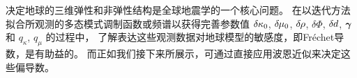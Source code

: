 {{{{%

决定地球的三维弹性和非弹性结构是全球地震学的一个核心问题。
在以迭代方法拟合所观测的多态模式调制函数或频谱以获得完善参数值
$\delta\hspace{-0.1 mm}\kappa_0$, $\delta\hspace{-0.2 mm}\mu_0$,
$\delta\hspace{-0.2 mm}\rho$, $\delta\Phi$,
$\delta\hspace{-0.1 mm}d$, $\mbox{\boldmath $\bf \gamma$}$ 和 $q_{\kappa}$, $q_{\mu}$
的过程中，
了解表达这些观测数据对地球模型的敏感度，即Fr\'{e}chet导数，是有助益的。
%
而正如我们接下来所展示，可通过直接应用波恩近似来决定这些偏导数。

}}}}
